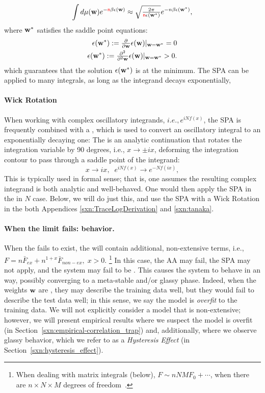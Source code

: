 \begin{align}
  \label{eqn:SPA}
  \int d\mu({\mathbf{w}}) e^{-{\color{red}\sf{n}}\beta\epsilon({\mathbf{w}})}\approx \sqrt{\tfrac{2\pi}{{\color{red}\sf{n}}\epsilon({\mathbf{w}}^{*})}} e^{-n\beta\epsilon({\mathbf{w}}^{*})}  ,
\end{align}
where ${\mathbf{w}}^{*}$ satisfies the saddle point equations:
\begin{align}
  \epsilon({\mathbf{w}}^{*}):=\tfrac{\partial}{\partial {\mathbf{w}}}\epsilon({\mathbf{w}})\vert_{{\mathbf{w}}={\mathbf{w}}^{*}}=0 \\
  \epsilon({\mathbf{w}}^{*}):=\tfrac{\partial^{2}}{\partial^{2} {\mathbf{w}}}\epsilon({\mathbf{w}})\vert_{{\mathbf{w}}={\mathbf{w}}^{*}}>0  .
\end{align}
which guarantees that the solution $\epsilon({\mathbf{w}}^{*})$ is at the minimum.
The SPA can be applied to many \LargeN integrals, as long as the integrand decays exponentially,  

\paragraph{Wick Rotation} When working with complex oscillatory integrands, $i.e., e^{iNf(x)}$,   
the SPA is frequently combined with a \emph{\WickRotation}, 
which is used to convert an oscillatory integral to an exponentially decaying one:
The \WickRotation is an analytic continuation that rotates the integration variable by 90 degrees, i.e., $x \to \pm i x$, deforming the integration contour to pass through a saddle point of the integrand:
\begin{equation}
x\rightarrow ix,\;\;e^{iNf(x)}\rightarrow e^{-Nf(ix)},
\end{equation}
This is typically used in formal sense; that is, one assumes the resulting complex integrand is both analytic and well-behaved.
One would then apply the SPA in the \LargeN in $N$ case.
Below, we will do just this, and  use the SPA with a Wick Rotation in the both Appendices \ref{sxn:TraceLogDerivation} and \ref{sxn:tanaka}.

\paragraph{When the \Thermodynamic limit fails: \ATypical behavior.}
When the \ThermodynamicLimit fails to exist, the \FreeEnergy will contain additional, non-extensive terms, i.e.,
$F = n\bar{F}_{ex} + n^{1+x}\bar{F}_{non-ex},\;x>0$.
\footnote{When dealing with matrix integrals (below), $F\sim nNMF_{0}+\cdots$, when there are $n \times N \times M$ degrees
of freedom~\cite{PP95}.}
In this case, the AA may fail, the SPA may not apply, and the system may fail to be \SelfAveraging.
This causes the system to behave in an \ATypical way, 
possibly converging to a meta-stable and/or glassy phase.
Indeed, when the weights ${\mathbf{w}}$ are \emph{\ATypical}, they may describe the training data well, 
but they would fail to describe the test data well; in this sense, we say the model is \emph{overfit} to the training data.
We will not explicitly consider a model that is non-extensive; however, we will
present empirical results where we suspect the model is overfit
(in Section~\ref{sxn:empirical-correlation_trap})
and, additionally, where we observe glassy behavior, which we refer to as a \emph{Hysteresis Effect}
(in Section~\ref{sxn:hysteresis_effect}).



